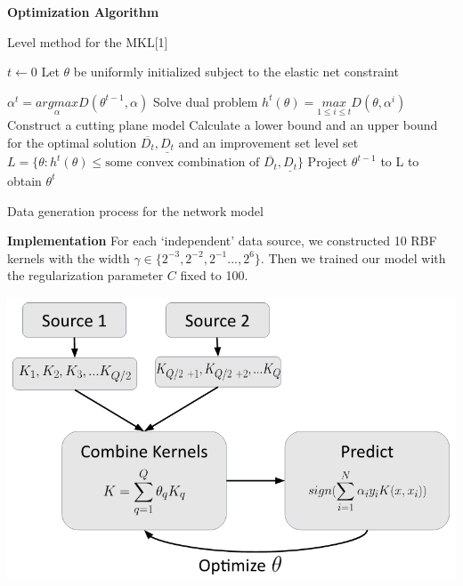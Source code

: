 \documentclass{article}
\begin{document}
\textbf{Optimization Algorithm}

\begin{algorithm}
\centering
\begin{algorithmic}[1]
    \caption{Level method for the MKL[1]}

    \item[] 
    \State $t \leftarrow 0$
    \State Let $\theta$ be uniformly initialized subject to the elastic net constraint

    \item[]
        \State $\alpha^{t} = \underset{\alpha}{argmax}D(\theta^{t-1}, \alpha)$
            \Comment Solve dual problem
        \State $h^t(\theta) = \underset{1 \leq i \leq t}{max} D(\theta, \alpha^i)$
            \Comment Construct a cutting plane model
        \State Calculate a lower bound and an upper bound for the optimal solution $\overline{D_t}, \underline{D_t}$ and an improvement set level set $L = \{\theta: h^t(\theta) \leq \text{some convex combination of }\overline{D_t}, \underline{D_t}\}$
        \State Project $\theta^{t-1}$ to L to obtain $\theta^t$
    \EndWhile
\end{algorithmic}
\caption{Data generation process for the network model}
\label{alg:network_model}
\end{algorithm}

\textbf{Implementation}
For each `independent' data source, we constructed 10 RBF kernels with the width $\gamma \in \{2^{-3}, 2^{-2}, 2^{-1} ..., 2^{6}\}$. Then we trained our model with the regularization parameter $C$ fixed to 100.

\begin{minipage}{\textwidth}
    \centering
    \includegraphics[scale=.4]{implementation_flowchart.png}
    \label{fig:implementation_flowchart}
\end{minipage}
\end{document}

